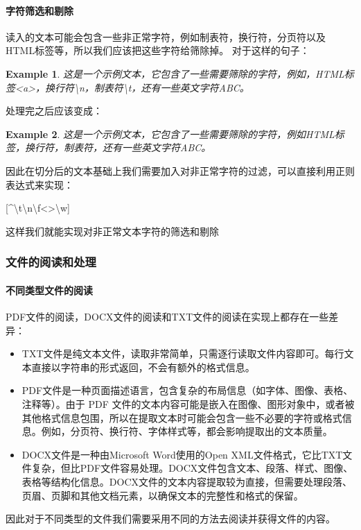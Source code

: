 \documentclass[a4paper]{report}
\newtheorem{example}{Example}
\begin{document}
\paragraph{字符筛选和剔除}
读入的文本可能会包含一些非正常字符，例如制表符，换行符，分页符以及HTML标签等，所以我们应该把这些字符给筛除掉。
对于这样的句子：
\begin{example}
	这是一个示例文本，它包含了一些需要筛除的字符，例如，{\rm HTML}标签{\rm <a>}，换行符{\rm\textbackslash n}，制表符{\rm\textbackslash t}，还有一些英文字符ABC。
\end{example}
处理完之后应该变成：
\begin{example}
	这是一个示例文本，它包含了一些需要筛除的字符，例如{\rm HTML}标签，换行符，制表符，还有一些英文字符ABC。
\end{example}
因此在切分后的文本基础上我们需要加入对非正常字符的过滤，可以直接利用正则表达式来实现：
\begin{center}
	[\^{}{\textbackslash t\textbackslash n\textbackslash f<>\textbackslash w}]
\end{center}
这样我们就能实现对非正常文本字符的筛选和剔除
\subsubsection{文件的阅读和处理}
\paragraph{不同类型文件的阅读}
PDF文件的阅读，DOCX文件的阅读和TXT文件的阅读在实现上都存在一些差异：
\begin{itemize}
	\item TXT文件是纯文本文件，读取非常简单，只需逐行读取文件内容即可。每行文本直接以字符串的形式返回，不会有额外的格式信息。
	\item PDF文件是一种页面描述语言，包含复杂的布局信息（如字体、图像、表格、注释等）。由于 PDF 文件的文本内容可能是嵌入在图像、图形对象中，或者被其他格式信息包围，所以在提取文本时可能会包含一些不必要的字符或格式信息。例如，分页符、换行符、字体样式等，都会影响提取出的文本质量。
	\item DOCX文件是一种由Microsoft Word使用的Open XML文件格式，它比TXT文件复杂，但比PDF文件容易处理。DOCX文件包含文本、段落、样式、图像、表格等结构化信息。DOCX文件的文本内容提取较为直接，但需要处理段落、页眉、页脚和其他文档元素，以确保文本的完整性和格式的保留。
\end{itemize}
因此对于不同类型的文件我们需要采用不同的方法去阅读并获得文件的内容。
\end{document}

